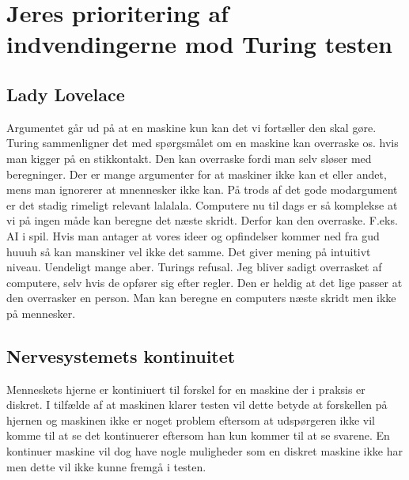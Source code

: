 \documentclass{article}
\begin{document}

\section{Jeres prioritering af indvendingerne mod Turing testen}
\subsection{Lady Lovelace}
Argumentet går ud på at en maskine kun kan det vi fortæller den skal gøre. Turing sammenligner det med spørgsmålet om en maskine kan overraske os. hvis man kigger på en stikkontakt. Den kan overraske fordi man selv sløser med beregninger.
Der er mange argumenter for at maskiner ikke kan et eller andet, mens man ignorerer at mnennesker ikke kan.
På trods af det gode modargument er det stadig rimeligt relevant lalalala.
Computere nu til dags er så komplekse at vi på ingen måde kan beregne det næste skridt. Derfor kan den overraske. F.eks. AI i spil.
Hvis man antager at vores ideer og opfindelser kommer ned fra gud huuuh så kan manskiner vel ikke det samme.
Det giver mening på intuitivt niveau.
Uendeligt mange aber.
Turings refusal. Jeg bliver sadigt overrasket af computere, selv hvis de opfører sig efter regler. Den er heldig at det lige passer at den overrasker en person.
Man kan beregne en computers næste skridt men ikke på mennesker.

\subsection{Nervesystemets kontinuitet}

Menneskets hjerne er kontiniuert til forskel for en maskine der i praksis er diskret. I tilfælde af at maskinen klarer testen vil dette betyde at forskellen på hjernen og maskinen ikke er noget problem eftersom at udspørgeren ikke vil komme til at se det kontinuerer eftersom han kun kommer til at se svarene. En kontinuer maskine vil dog have nogle muligheder som en diskret maskine ikke har men dette vil ikke kunne fremgå i testen.
\end{document}

